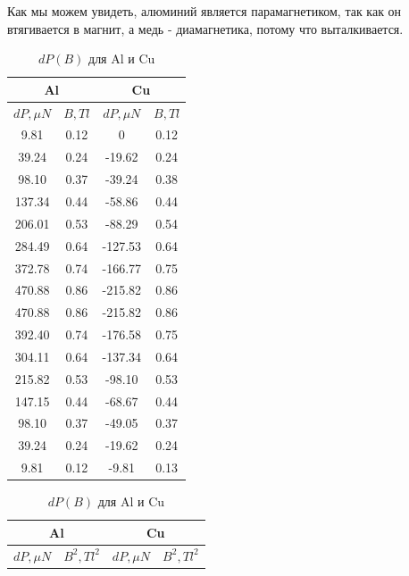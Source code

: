 \documentclass[a4paper, 12pt]{article}
\begin{document}
Как мы можем увидеть, алюминий является парамагнетиком, так как он втягивается
в магнит, а медь - диамагнетика, потому что выталкивается.

\begin{table}[htbp]
    \centering
    \begin{subtable}[t]{0.45\textwidth}
        \centering
        \begin{tabular}{|c|c|c|c|}
        \hline
        \multicolumn{2}{|c|}{Al} & \multicolumn{2}{c|}{Cu} \\ \hline
        $dP, \mu N$ & $B, Tl$ & $dP, \mu N$ & $B, Tl$      \\ \hline
        9.81   & 0.12 & 0       & 0.12  \\ \hline
        39.24  & 0.24 & -19.62  & 0.24  \\ \hline
        98.10  & 0.37 & -39.24  & 0.38  \\ \hline
        137.34 & 0.44 & -58.86  & 0.44  \\ \hline
        206.01 & 0.53 & -88.29  & 0.54  \\ \hline
        284.49 & 0.64 & -127.53 & 0.64  \\ \hline
        372.78 & 0.74 & -166.77 & 0.75  \\ \hline
        470.88 & 0.86 & -215.82 & 0.86  \\ \hline
        470.88 & 0.86 & -215.82 & 0.86  \\ \hline
        392.40 & 0.74 & -176.58 & 0.75  \\ \hline
        304.11 & 0.64 & -137.34 & 0.64  \\ \hline
        215.82 & 0.53 & -98.10  & 0.53  \\ \hline
        147.15 & 0.44 & -68.67  & 0.44  \\ \hline
        98.10  & 0.37 & -49.05  & 0.37  \\ \hline
        39.24  & 0.24 & -19.62  & 0.24  \\ \hline
        9.81   & 0.12 & -9.81   & 0.13  \\ \hline
        \end{tabular}
        \caption{$dP(B)$ для Al и Cu}
    \end{subtable}%
    \hfill
    \begin{subtable}[t]{0.45\textwidth}
        \centering
        \begin{tabular}{|c|c|c|c|}
        \hline
        \multicolumn{2}{|c|}{Al} & \multicolumn{2}{c|}{Cu} \\ \hline
        $dP, \mu N$ & $B^2, Tl^2$ & $dP, \mu N$ & $B^2, Tl^2$      \\ \hline

\end{tabular}
\end{subtable}
\end{table}
\end{document}
